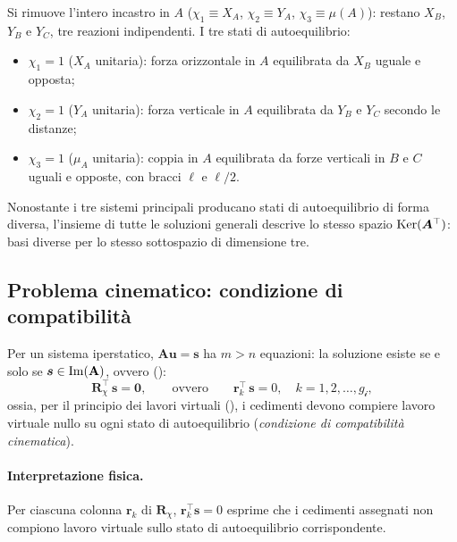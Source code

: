 \begin{esempio}
\begin{svolgimento}
		Si rimuove l'intero incastro in $A$
		($\chi_1 \equiv X_A$, $\chi_2 \equiv Y_A$,
		$\chi_3 \equiv \mu(A)$): restano $X_B$, $Y_B$ e $Y_C$,
		tre reazioni indipendenti. I tre stati di autoequilibrio:
		\begin{itemize}[noitemsep]
			\item $\chi_1 = 1$ ($X_A$ unitaria): forza orizzontale
			in $A$ equilibrata da $X_B$ uguale e opposta;
			\item $\chi_2 = 1$ ($Y_A$ unitaria): forza verticale
			in $A$ equilibrata da $Y_B$ e $Y_C$ secondo le
			distanze;
			\item $\chi_3 = 1$ ($\mu_A$ unitaria): coppia in $A$
			equilibrata da forze verticali in $B$ e $C$ uguali
			e opposte, con bracci $\ell$ e $\ell/2$.
		\end{itemize}
		
		\smallskip
		Nonostante i tre sistemi principali producano stati di
		autoequilibrio di forma diversa, l'insieme di tutte le
		soluzioni generali descrive lo stesso spazio
		$\operatorname{Ker}(\bm{A}^{\top})$: basi diverse per lo stesso
		sottospazio di dimensione tre.
		
	\end{svolgimento}
\end{esempio}




\subsection{Problema cinematico: condizione di compatibilità}
\label{sec:iperstatico_cin}


Per un sistema iperstatico, $\bm{A}\bm{u} = \bm{s}$
ha $m > n$ equazioni: la soluzione esiste se e solo se
$\bm{s} \in \operatorname{Im}(\mathbf{A})$, ovvero ():
\begin{equation}\label{eq:compat_cin}
	\bm{R}_\chi^{\top}\,\bm{s} = \bm{0},
	\qquad\text{ovvero}\qquad
	\bm{r}_k^{\top}\,\bm{s} = 0,
	\quad k = 1, 2, \ldots, g_{\mathscr{i}},
\end{equation}
ossia, per il principio dei lavori virtuali (),
i cedimenti devono compiere lavoro virtuale nullo su ogni stato di
autoequilibrio (\emph{condizione di compatibilità cinematica}).

\paragraph{Interpretazione fisica.}
Per ciascuna colonna $\bm{r}_k$ di $\bm{R}_\chi$,
$\bm{r}_k^{\top}\bm{s} = 0$ esprime che i cedimenti assegnati
non compiono lavoro virtuale sullo stato di autoequilibrio
corrispondente.

